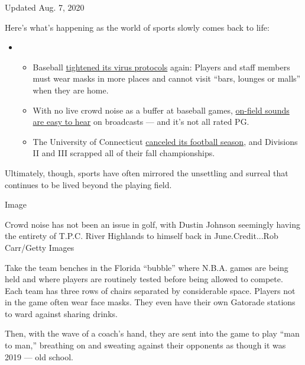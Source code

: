 Updated Aug. 7, 2020

Here's what's happening as the world of sports slowly comes back to
life:

\begin{itemize}
\item
  \begin{itemize}
  \tightlist
  \item
    Baseball
    \href{https://www.nytimes.com/2020/08/06/sports/baseball/mlb-safety-protocols.html?action=click\&pgtype=Article\&state=default\&region=MAIN_CONTENT_2\&context=storylines_keepup}{tightened
    its virus protocols} again: Players and staff members must wear
    masks in more places and cannot visit ``bars, lounges or malls''
    when they are home.
  \item
    With no live crowd noise as a buffer at baseball games,
    \href{https://www.nytimes.com/2020/08/06/sports/baseball/mlb-swearing.html?action=click\&pgtype=Article\&state=default\&region=MAIN_CONTENT_2\&context=storylines_keepup}{on-field
    sounds are easy to hear} on broadcasts --- and it's not all rated
    PG.
  \item
    The University of Connecticut
    \href{https://www.nytimes.com/2020/08/05/sports/ncaafootball/coronavirus-uconn-cancels-football.html?action=click\&pgtype=Article\&state=default\&region=MAIN_CONTENT_2\&context=storylines_keepup}{canceled
    its football season}, and Divisions II and III scrapped all of their
    fall championships.
  \end{itemize}
\end{itemize}

Ultimately, though, sports have often mirrored the unsettling and
surreal that continues to be lived beyond the playing field.

Image

Crowd noise has not been an issue in golf, with Dustin Johnson seemingly
having the entirety of T.P.C. River Highlands to himself back in
June.Credit...Rob Carr/Getty Images

Take the team benches in the Florida ``bubble'' where N.B.A. games are
being held and where players are routinely tested before being allowed
to compete. Each team has three rows of chairs separated by considerable
space. Players not in the game often wear face masks. They even have
their own Gatorade stations to ward against sharing drinks.

Then, with the wave of a coach's hand, they are sent into the game to
play ``man to man,'' breathing on and sweating against their opponents
as though it was 2019 --- old school.

